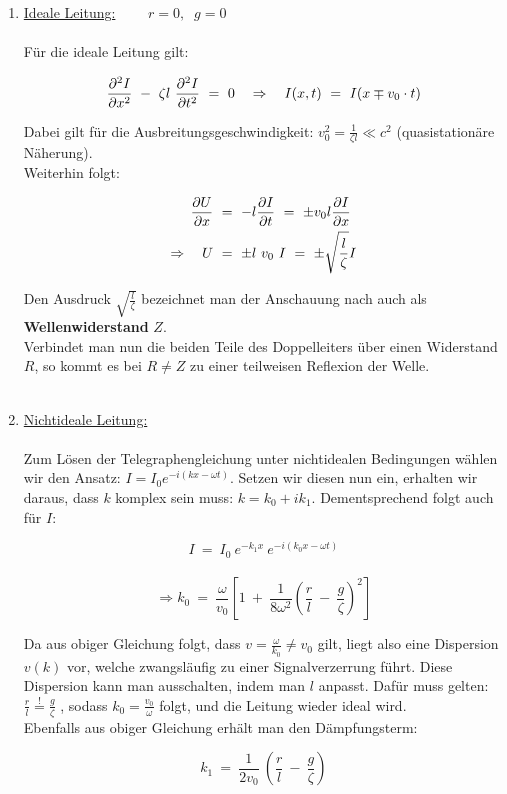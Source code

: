 \begin{enumerate}[label=\roman*)]
\item \underline{Ideale Leitung:} $\qquad r=0, \; \; g=0$
\ \\
\ \\
Für die ideale Leitung gilt:

\begin{equation*}
\pddiff{I}{x} \ - \ \zeta l \ \pddiff{I}{t} \ = \  	0 \quad \Rightarrow\quad I(x,t)  \ = \ I(x \mp v_0\cdot t)
\end{equation*}

Dabei gilt für die Ausbreitungsgeschwindigkeit: $v_0^2 = \frac{1}{\zeta l} \ll c^2$ (quasistationäre Näherung).\\
Weiterhin folgt:

\begin{align*}
\frac{\partial{U}}{\partial{x}} \ &= \ - l\frac{\partial{I}}{\partial{t}} \ = \ \pm v_0 l \frac{\partial{I}}{\partial{x}}\\
\Rightarrow \quad U \ &= \ \pm l \ v_0 \ I  \ = \ \pm \sqrt{\frac{l}{\zeta}}I 
\end{align*}

Den Ausdruck $\sqrt{\frac{l}{\zeta}}$ bezeichnet man der Anschauung nach auch als \textbf{Wellenwiderstand} $Z$.\\
Verbindet man nun die beiden Teile des Doppelleiters über einen Widerstand $R$, so kommt es bei $R\neq Z$ zu einer teilweisen Reflexion der Welle.\\
\ \\
\item \underline{Nichtideale Leitung:}
\ \\
\ \\

Zum Lösen der Telegraphengleichung unter nichtidealen Bedingungen wählen wir den Ansatz: $I=I_0 e^{-i(kx-\omega t)}$. Setzen wir diesen nun ein, erhalten wir daraus, dass $k$ komplex sein muss: $k=k_0 + ik_1$. Dementsprechend folgt auch für $I$:

\begin{equation*}
I  \ = \ I_0 \ e^{-k_1 x} \ e^{-i(k_0 x -\omega t)}
\end{equation*}
\ \\
\begin{equation*}
\Rightarrow k_0  \ = \ \frac{\omega}{v_0}\left[1 \ + \ \frac{1}{8\omega^2}\left(\frac{r}{l} \ - \ \frac{g}{\zeta}\right)^2\right]
\end{equation*}

Da aus obiger Gleichung folgt, dass $v= \frac{\omega}{k_0}\neq v_0$ gilt, liegt also eine Dispersion $v(k)$ vor, welche zwangsläufig zu einer Signalverzerrung führt. Diese Dispersion kann man \grqq ausschalten\grqq , indem man  $l$ anpasst. Dafür muss gelten: $\frac{r}{l} \overset{!}{=}   \frac{g}{\zeta}$ , sodass $k_0 =\frac{v_0}{\omega}$ folgt, und die Leitung wieder ideal wird.\\
Ebenfalls aus obiger Gleichung erhält man den Dämpfungsterm:

\begin{equation*}
k_1  \ = \ \frac{1}{2v_0} \ \left(\frac{r}{l} \ - \ \frac{g}{\zeta}\right)
\end{equation*}
\end{enumerate}

